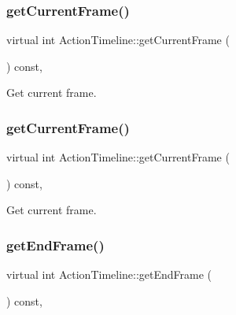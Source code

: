 \subsubsection{\texorpdfstring{get\+Current\+Frame()}{getCurrentFrame()}\hspace{0.1cm}{\footnotesize\ttfamily [1/2]}}
{\footnotesize\ttfamily virtual int Action\+Timeline\+::get\+Current\+Frame (\begin{DoxyParamCaption}{ }\end{DoxyParamCaption}) const\hspace{0.3cm}{\ttfamily [inline]}, {\ttfamily [virtual]}}

Get current frame. \mbox{\label{classActionTimeline_a63469259c3007a0a25eafed675ab3e86}} 
\subsubsection{\texorpdfstring{get\+Current\+Frame()}{getCurrentFrame()}\hspace{0.1cm}{\footnotesize\ttfamily [2/2]}}
{\footnotesize\ttfamily virtual int Action\+Timeline\+::get\+Current\+Frame (\begin{DoxyParamCaption}{ }\end{DoxyParamCaption}) const\hspace{0.3cm}{\ttfamily [inline]}, {\ttfamily [virtual]}}

Get current frame. \mbox{\label{classActionTimeline_a1bdee13b0de8081126528d2f7f4e1479}} 
\subsubsection{\texorpdfstring{get\+End\+Frame()}{getEndFrame()}\hspace{0.1cm}{\footnotesize\ttfamily [1/2]}}
{\footnotesize\ttfamily virtual int Action\+Timeline\+::get\+End\+Frame (\begin{DoxyParamCaption}{ }\end{DoxyParamCaption}) const\hspace{0.3cm}{\ttfamily [inline]}, {\ttfamily [virtual]}}

